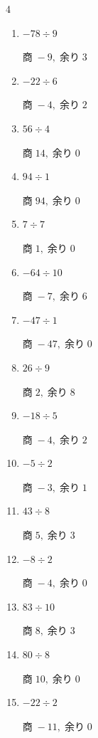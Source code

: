 \begin{multicols}{4}
\begin{enumerate}
  \item $-78 \div 9$

        $商\; -9,\; 余り\; 3$

  \item $-22 \div 6$

        $商\; -4,\; 余り\; 2$

  \item $56 \div 4$

        $商\; 14,\; 余り\; 0$

  \item $94 \div 1$

        $商\; 94,\; 余り\; 0$

\columnbreak %

  \item $7 \div 7$

        $商\; 1,\; 余り\; 0$

  \item $-64 \div 10$

        $商\; -7,\; 余り\; 6$

  \item $-47 \div 1$

        $商\; -47,\; 余り\; 0$

  \item $26 \div 9$

        $商\; 2,\; 余り\; 8$

  \item $-18 \div 5$

        $商\; -4,\; 余り\; 2$

  \item $-5 \div 2$

        $商\; -3,\; 余り\; 1$

  \item $43 \div 8$

        $商\; 5,\; 余り\; 3$

  \item $-8 \div 2$

        $商\; -4,\; 余り\; 0$

  \item $83 \div 10$

        $商\; 8,\; 余り\; 3$

  \item $80 \div 8$

        $商\; 10,\; 余り\; 0$

  \item $-22 \div 2$

        $商\; -11,\; 余り\; 0$


\end{enumerate}
\end{multicols}
